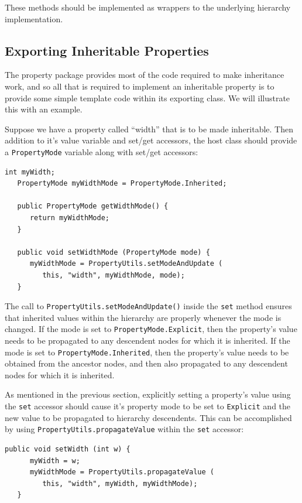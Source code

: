 \documentclass{article}
\begin{document}
These methods should be implemented as wrappers to the underlying
hierarchy implementation.

\subsection{Exporting Inheritable Properties}

The property package provides most of the code required to make
inheritance work, and so all that is required to implement an
inheritable property is to provide some simple template code within
its exporting class. We will illustrate this with an example.

Suppose we have a property called ``width'' that is to be made
inheritable.  Then addition to it's value variable and set/get
accessors, the host class should provide a {\tt PropertyMode} variable
along with set/get accessors:
\begin{lstlisting}[]
   int myWidth;
   PropertyMode myWidthMode = PropertyMode.Inherited;
   
   public PropertyMode getWidthMode() {
      return myWidthMode;
   }

   public void setWidthMode (PropertyMode mode) {
      myWidthMode = PropertyUtils.setModeAndUpdate (
         this, "width", myWidthMode, mode);
   }
\end{lstlisting}
The call to {\tt PropertyUtils.setModeAndUpdate()} inside the 
{\tt set} method ensures that inherited values within the hierarchy are
properly whenever the mode is changed. If the mode is set to 
{\tt PropertyMode.Explicit}, then the property's value needs to be
propagated to any descendent nodes for which it is inherited.  If the
mode is set to {\tt PropertyMode.Inherited}, then the property's value
needs to be obtained from the ancestor nodes, and then also propagated
to any descendent nodes for which it is inherited.

As mentioned in the previous section, explicitly setting a property's
value using the {\tt set} accessor should cause it's property mode to
be set to {\tt Explicit} and the new value to be propagated to
hierarchy descendents.  This can be accomplished by using 
{\tt PropertyUtils.propagateValue} within the {\tt set} accessor:
\begin{lstlisting}[]
   public void setWidth (int w) {
      myWidth = w;
      myWidthMode = PropertyUtils.propagateValue (
         this, "width", myWidth, myWidthMode);
   }     
\end{lstlisting}
\end{document}

